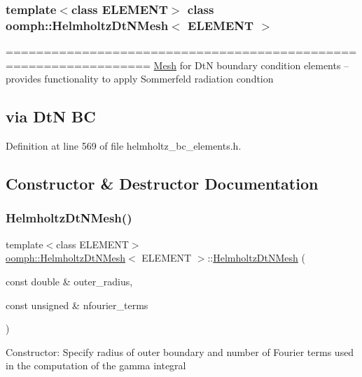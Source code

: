 \subsubsection*{template$<$class E\+L\+E\+M\+E\+NT$>$\newline
class oomph\+::\+Helmholtz\+Dt\+N\+Mesh$<$ E\+L\+E\+M\+E\+N\+T $>$}

================================================================= \hyperlink{classoomph_1_1Mesh}{Mesh} for DtN boundary condition elements -- provides functionality to apply Sommerfeld radiation condtion \subsection*{via DtN BC }

Definition at line 569 of file helmholtz\+\_\+bc\+\_\+elements.\+h.



\subsection{Constructor \& Destructor Documentation}
\mbox{\label{classoomph_1_1HelmholtzDtNMesh_ae08e8842a44a5082b1d77634a9392b5f}} 
\subsubsection{\texorpdfstring{Helmholtz\+Dt\+N\+Mesh()}{HelmholtzDtNMesh()}}
{\footnotesize\ttfamily template$<$class E\+L\+E\+M\+E\+NT$>$ \\
\hyperlink{classoomph_1_1HelmholtzDtNMesh}{oomph\+::\+Helmholtz\+Dt\+N\+Mesh}$<$ E\+L\+E\+M\+E\+NT $>$\+::\hyperlink{classoomph_1_1HelmholtzDtNMesh}{Helmholtz\+Dt\+N\+Mesh} (\begin{DoxyParamCaption}\item[{const double \&}]{outer\+\_\+radius,  }\item[{const unsigned \&}]{nfourier\+\_\+terms }\end{DoxyParamCaption})\hspace{0.3cm}{\ttfamily [inline]}}

Constructor\+: Specify radius of outer boundary and number of Fourier terms used in the computation of the gamma integral 

